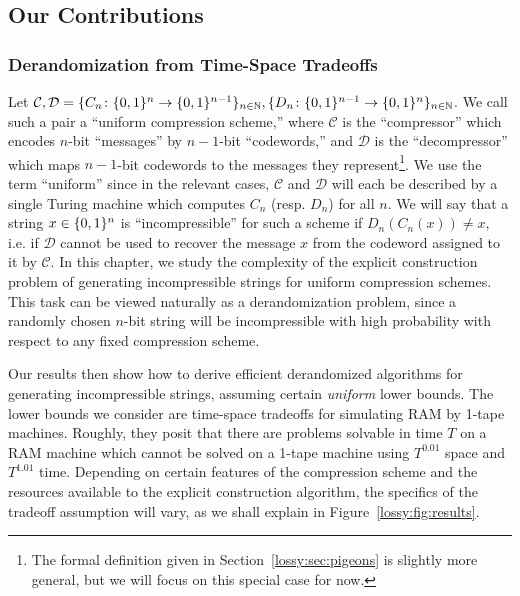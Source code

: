 

\subsection{Our Contributions}
\subsubsection{Derandomization from Time-Space Tradeoffs}
Let $\mathcal{C}, \mathcal{D} = \{C_n\colon \{0,1\}^{n} \rightarrow \{0,1\}^{n-1}\}_{n \in \mathbb{N}}, \{D_n\colon \{0,1\}^{n-1} \rightarrow \{0,1\}^{n}\}_{n \in \mathbb{N}}$. We call such a pair a ``uniform compression scheme,'' where $\mathcal{C}$ is the ``compressor'' which encodes $n$-bit ``messages'' by $n-1$-bit ``codewords,'' and $\mathcal{D}$ is the ``decompressor'' which maps $n-1$-bit codewords to the messages they represent\footnote{The formal definition given in Section~\ref{lossy:sec:pigeons} is slightly more general, but we will focus on this special case for now.}. We use the term ``uniform'' since in the relevant cases, $\mathcal{C}$ and $\mathcal{D}$ will each be described by a single Turing machine which computes $C_n$ (resp. $D_n$) for all $n$. We will say that a string $x \in \{0,1\}^n$ is ``incompressible'' for such a scheme if $D_n(C_n(x)) \neq x$, i.e. if $\mathcal{D}$ cannot be used to recover the message $x$ from the codeword assigned to it by $\mathcal{C}$. In this chapter, we study the complexity of the explicit construction problem of generating incompressible strings for uniform compression schemes. This task can be viewed naturally as a derandomization problem, since a randomly chosen $n$-bit string will be incompressible with high probability with respect to any fixed compression scheme.

Our results then show how to derive efficient derandomized algorithms for generating incompressible strings, assuming certain \emph{uniform} lower bounds. The lower bounds we consider are time-space tradeoffs for simulating RAM by 1-tape machines. Roughly, they posit that there are problems solvable in time $T$ on a RAM machine which cannot be solved on a 1-tape machine using $T^{0.01}$ space and $T^{1.01}$ time. Depending on certain features of the compression scheme and the resources available to the explicit construction algorithm, the specifics of the tradeoff assumption will vary, as we shall explain in Figure~\ref{lossy:fig:results}.

